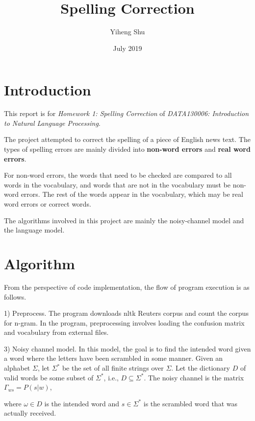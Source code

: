 \documentclass{article}
\title{Spelling Correction}
\author[*]{Yiheng Shu}
\affil[*]{Software College, Northeastern University, China}
\date{July 2019}
\begin{document}
\maketitle

\section{Introduction}

\label{sec:introduction} 

This report is for \textit{Homework 1: Spelling Correction} of \textit{DATA130006: Introduction to Natural Language
Processing}.

The project attempted to correct the spelling of a piece of English news text. The types of spelling errors are mainly divided into \textbf{non-word errors} and \textbf{real word errors}.

For non-word errors, the words that need to be checked are compared
to all words in the vocabulary, and words that are not in the vocabulary
must be non-word errors. The rest of the words appear in the vocabulary,
which may be real word errors or correct words.

The algorithms involved in this project are mainly the noisy-channel
model and the language model.

\section{Algorithm}

\label{sec:algorithm}

From the perspective of code implementation, the flow of program execution
is as follows.

1) Preprocess. The program downloads nltk Reuters corpus and count the corpus for n-gram. In the program, preprocessing involves loading the confusion matrix and vocabulary from external files.



3) Noisy channel model. In this model, the goal is to find the intended word given a word where the letters have been scrambled in some manner.
Given an alphabet $\Sigma$, let $\Sigma^{*}$ be the set of all finite strings over $\Sigma$. Let the dictionary $D$ of valid words be some subset of $\Sigma^{*}$, i.e., $D\subseteq\Sigma^{*}$. The noisy channel is the matrix $\varGamma_{ws}=P(s|w)$,

where $\omega\in D$ is the intended word and $s\in\Sigma^{*}$ is the scrambled word that was actually received.
\end{document}
